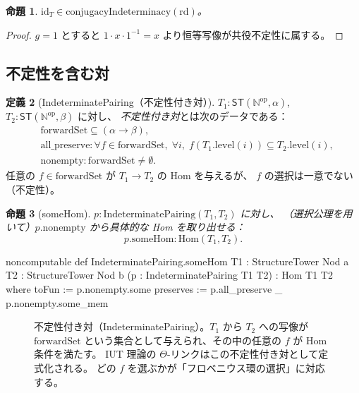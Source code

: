 \documentclass[a4paper,11pt]{ltjsarticle}
\theoremstyle{definition}
\newtheorem{definition}{定義}[section]
\theoremstyle{plain}
\newtheorem{proposition}[definition]{命題}
\theoremstyle{remark}
\newcommand{\ST}{\mathsf{ST}}
\newcommand{\Hom}{\mathrm{Hom}}
\newcommand{\id}{\mathrm{id}}
\newcommand{\Nod}{\mathbb{N}^{\mathrm{op}}}
\begin{document}
\begin{proposition}
$\id_T \in \mathrm{conjugacyIndeterminacy}(\mathrm{rd})$。
\end{proposition}

\begin{proof}
$g = 1$ とすると $1 \cdot x \cdot 1^{-1} = x$ より恒等写像が共役不定性に属する。
\end{proof}

\subsection{不定性を含む対}

\begin{definition}[IndeterminatePairing（不定性付き対）]
\label{def:indpair}
$T_1 : \ST(\Nod, \alpha)$, $T_2 : \ST(\Nod, \beta)$ に対し、
\emph{不定性付き対}とは次のデータである：
\begin{align*}
  &\mathrm{forwardSet} \subseteq (\alpha \to \beta), \\
  &\mathrm{all\_preserve} : \forall f \in \mathrm{forwardSet},\; \forall i,\;
    f(T_1.\mathrm{level}(i)) \subseteq T_2.\mathrm{level}(i), \\
  &\mathrm{nonempty} : \mathrm{forwardSet} \neq \emptyset.
\end{align*}
任意の $f \in \mathrm{forwardSet}$ が $T_1 \to T_2$ の Hom を与えるが、
$f$ の選択は一意でない（不定性）。
\end{definition}

\begin{proposition}[someHom]
$p : \mathrm{IndeterminatePairing}(T_1, T_2)$ に対し、
（選択公理を用いて）$p.\mathrm{nonempty}$ から具体的な Hom を取り出せる：
\[
  p.\mathrm{someHom} : \Hom(T_1, T_2).
\]
\end{proposition}

\begin{leancode}[caption={IndeterminatePairing と someHom}]
noncomputable def IndeterminatePairing.someHom
    {T1 : StructureTower Nod a} {T2 : StructureTower Nod b}
    (p : IndeterminatePairing T1 T2) : Hom T1 T2 where
  toFun    := p.nonempty.some
  preserves := p.all_preserve _ p.nonempty.some_mem
\end{leancode}

\begin{figure}[H]
\centering
{}
\caption{不定性付き対（IndeterminatePairing）。$T_1$ から $T_2$ への写像が
$\mathrm{forwardSet}$ という集合として与えられ、その中の任意の $f$ が Hom 条件を満たす。
IUT 理論の $\Theta$-リンクはこの不定性付き対として定式化される。
どの $f$ を選ぶかが「フロベニウス環の選択」に対応する。}
\label{fig:indeterminate}
\end{figure}
\end{document}
